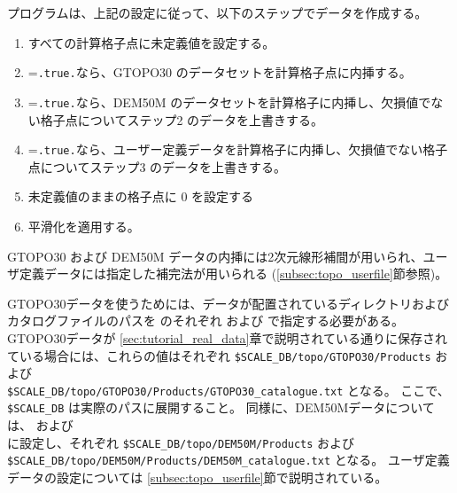 プログラムは、上記の設定に従って、以下のステップでデータを作成する。
\begin{enumerate}[1)]
 \item すべての計算格子点に未定義値を設定する。
 \item {}=\verb|.true.|なら、GTOPO30 のデータセットを計算格子点に内挿する。
 \item {}=\verb|.true.|なら、DEM50M のデータセットを計算格子に内挿し、欠損値でない格子点についてステップ2 のデータを上書きする。
 \item {}=\verb|.true.|なら、ユーザー定義データを計算格子に内挿し、欠損値でない格子点についてステップ3 のデータを上書きする。
 \item 未定義値のままの格子点に 0 を設定する
 \item 平滑化を適用する。
\end{enumerate}
GTOPO30 および DEM50M データの内挿には2次元線形補間が用いられ、ユーザ定義データには指定した補完法が用いられる (\ref{subsec:topo_userfile}節参照)。

GTOPO30データを使うためには、データが配置されているディレクトリおよびカタログファイルのパスを  のそれぞれ  および  で指定する必要がある。
GTOPO30データが \ref{sec:tutorial_real_data}章で説明されている通りに保存されている場合には、これらの値はそれぞれ \verb|$SCALE_DB/topo/GTOPO30/Products| および \\ \verb|$SCALE_DB/topo/GTOPO30/Products/GTOPO30_catalogue.txt| となる。
ここで、\verb|$SCALE_DB| は実際のパスに展開すること。
同様に、DEM50Mデータについては、 および \\  に設定し、それぞれ \verb|$SCALE_DB/topo/DEM50M/Products| および \\ \verb|$SCALE_DB/topo/DEM50M/Products/DEM50M_catalogue.txt| となる。
ユーザ定義データの設定については \ref{subsec:topo_userfile}節で説明されている。


